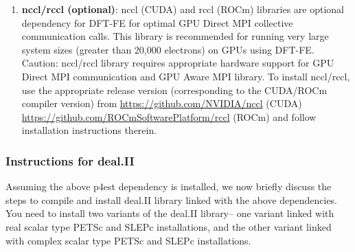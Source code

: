 \begin{enumerate}

\item {\bf nccl/rccl (optional)}: nccl (CUDA) and rccl (ROCm) libraries are optional dependency for DFT-FE for optimal GPU Direct MPI collective communication calls. This library is recommended for running very large system sizes (greater than 20,000 electrons) on GPUs using DFT-FE. Caution: nccl/rccl library requires appropriate hardware support for GPU Direct MPI communication and GPU Aware MPI library. To install nccl/rccl, use the appropriate release version (corresponding to the CUDA/ROCm compiler version) from \url{https://github.com/NVIDIA/nccl} (CUDA) \url{https://github.com/ROCmSoftwarePlatform/rccl} (ROCm) and follow installation instructions therein.

\end{enumerate}


\subsubsection{Instructions for deal.II}
Assuming the above p4est dependency is installed, we now briefly discuss the steps to compile and install deal.II library linked with the above dependencies. You need to install two variants of the deal.II library-- one variant linked with real scalar type PETSc and SLEPc installations, and the other variant linked with complex scalar type PETSc and SLEPc installations. 

